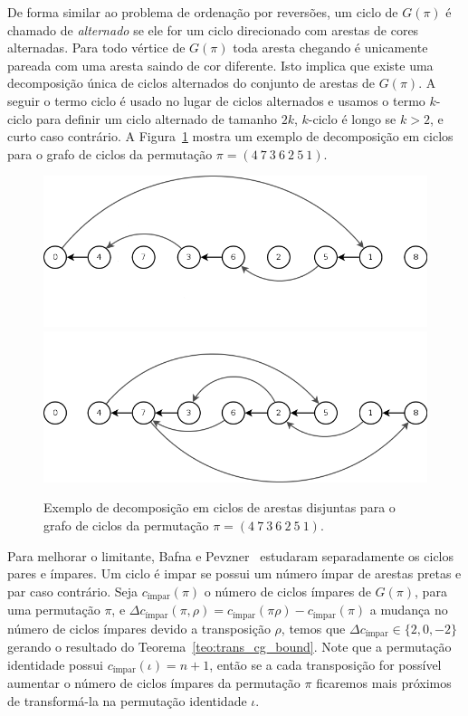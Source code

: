 De forma similar ao problema de ordenação por reversões, um ciclo de
$G(\pi)$ é chamado de \textit{alternado} se ele for um ciclo direcionado
com arestas de cores alternadas. Para todo vértice de $G(\pi)$ toda
aresta chegando é unicamente pareada com uma aresta saindo de cor
diferente. Isto implica que existe uma decomposição única de ciclos
alternados do conjunto de arestas de $G(\pi)$. A seguir o termo ciclo é
usado no lugar de ciclos alternados e usamos o termo $k$-ciclo para
definir um ciclo alternado de tamanho $2k$, $k$-ciclo é longo se $k >
2$, e curto caso contrário. A Figura~\ref{fig:tra_grafo_bkp_dec} mostra
um exemplo de decomposição em ciclos para o grafo de ciclos da
permutação $\pi = (4~7~3~6~2~5~1)$.

\begin{figure}[h]
  \centering 
  \includegraphics[scale=0.6]{images/trans_cycle_graph_dec-1.png}
  \includegraphics[scale=0.6]{images/trans_cycle_graph_dec-2.png} 
  \caption{Exemplo de decomposição em ciclos de arestas disjuntas para
  o grafo de ciclos da permutação $\pi = (4~7~3~6~2~5~1)$.}
  \label{fig:tra_grafo_bkp_dec}
\end{figure}

Para melhorar o limitante, Bafna e Pevzner~\cite{BafnaPevzner*1998}
estudaram separadamente os ciclos pares e ímpares. Um ciclo é impar se
possui um número ímpar de arestas pretas e par caso contrário. Seja
$c_{\text{ímpar}}(\pi)$ o número de ciclos ímpares de $G(\pi)$, para uma
permutação $\pi$, e $\Delta c_{\text{ímpar}} (\pi,\rho) = c_{\text{ímpar}}
(\pi \rho) - c_{\text{ímpar}} (\pi)$ a mudança no número de ciclos
ímpares devido a transposição $\rho$, temos que $\Delta c_{\text{ímpar}}
\in \{2, 0, -2\}$ gerando o resultado do
Teorema~\ref{teo:trans_cg_bound}. Note que a permutação identidade
possui $c_{\text{ímpar}}(\iota) = n + 1$, então se a cada transposição
for possível aumentar o número de ciclos ímpares da permutação $\pi$
ficaremos mais próximos de transformá-la na permutação identidade
$\iota$.

